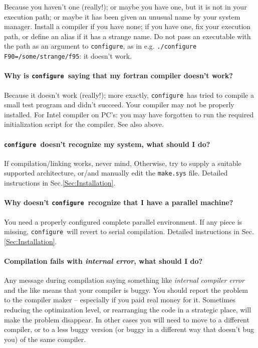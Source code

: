 \documentclass[12pt,a4paper]{article}
\def\configure{\texttt{configure}}
\begin{document}
Because you haven't one (really!); or maybe you have one, but it is not
in your execution path; or maybe it has been given an unusual name by your 
system manager. Install a compiler if you have none; if you have one, fix 
your execution path, or define an alias if it has a strange name. 
Do not pass an executable with the path as an argument to \configure, 
as in e.g. \texttt{./configure F90=/some/strange/f95}: it doesn't work.

\paragraph{Why is \configure\ saying that my fortran compiler doesn't work?}

Because it doesn't work (really!); more exactly, \configure\ has tried 
to compile a small test program and didn't succeed. Your compiler may not be 
properly installed. For Intel compiler on PC's: you may have forgotten to run 
the required initialization script for the compiler. See also above.

\paragraph{\configure\ doesn't recognize my system, what should I do?}

If compilation/linking works, never mind, Otherwise, try to supply a suitable  
supported architecture, or/and manually edit the \texttt{make.sys} file. 
Detailed instructions in Sec.\ref{Sec:Installation}.

\paragraph{Why doesn't \configure\ recognize that I have a parallel machine?}

You need a properly configured complete parallel environment. If any piece 
is missing, \configure\ will revert to serial compilation. 
Detailed instructions in Sec.\ref{Sec:Installation}.

\paragraph{Compilation fails with {\em internal error}, what should I do?}

Any message during compilation saying something like {\em internal compiler 
error}
and the like means that your compiler is buggy. You should report the problem 
to the compiler maker -- especially if you paid real money for it.
Sometimes reducing the optimization level, or rearranging the code in a
strategic place, will make the problem disappear. In other cases you 
will need to move to a different compiler, or to a less buggy version
(or buggy in a different way that doesn't bug you) of the same compiler.
\end{document}
